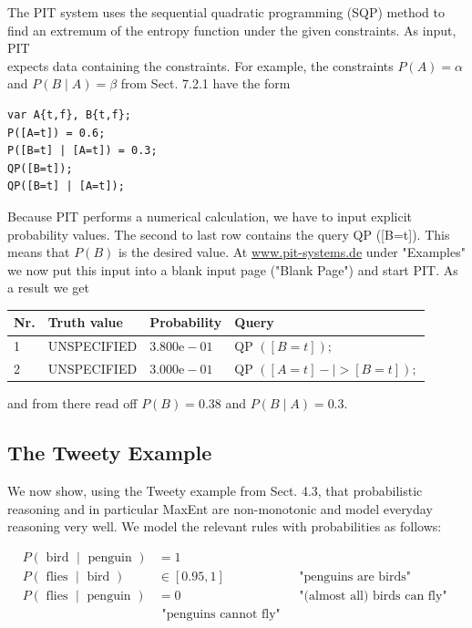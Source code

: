 \documentclass[10pt]{book}
\begin{document}
The PIT system uses the sequential quadratic programming (SQP) method to find an extremum of the entropy function under the given constraints. As input, PIT\\
expects data containing the constraints. For example, the constraints $P(A)=\alpha$ and $P(B \mid A)=\beta$ from Sect. 7.2.1 have the form


\begin{verbatim}
var A{t,f}, B{t,f};
P([A=t]) = 0.6;
P([B=t] | [A=t]) = 0.3;
QP([B=t]);
QP([B=t] | [A=t]);
\end{verbatim}

Because PIT performs a numerical calculation, we have to input explicit probability values. The second to last row contains the query QP ([B=t]). This means that $P(B)$ is the desired value. At \href{http://www.pit-systems.de}{www.pit-systems.de} under "Examples" we now put this input into a blank input page ("Blank Page") and start PIT. As a result we get

\begin{center}
\begin{tabular}{llll}
\hline
Nr. & Truth value & Probability & Query \\
\hline
1 & UNSPECIFIED & $3.800 \mathrm{e}-01$ & QP $([B=t]) ;$ \\
\hline
2 & UNSPECIFIED & $3.000 \mathrm{e}-01$ & QP $([A=t]-\mid>[B=t]) ;$ \\
\hline
\end{tabular}
\end{center}

and from there read off $P(B)=0.38$ and $P(B \mid A)=0.3$.

\subsection{The Tweety Example}
We now show, using the Tweety example from Sect. 4.3, that probabilistic reasoning and in particular MaxEnt are non-monotonic and model everyday reasoning very well. We model the relevant rules with probabilities as follows:

$$
\begin{array}{lll}
P(\text { bird } \mid \text { penguin }) & =1 & \\
P(\text { flies } \mid \text { bird }) & \in[0.95,1] & \text { "penguins are birds" } \\
P(\text { flies } \mid \text { penguin }) & =0 & \text { "(almost all) birds can fly" } \\
& \text { "penguins cannot fly" }
\end{array}
$$
\end{document}
